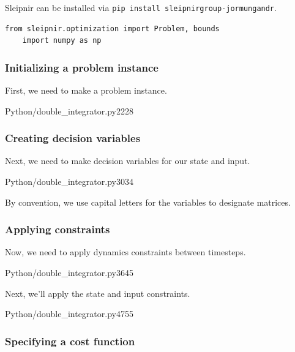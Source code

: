 Sleipnir can be installed via \texttt{pip install sleipnirgroup-jormungandr}.
\begin{code}
  \begin{lstlisting}[style=customPython]
    from sleipnir.optimization import Problem, bounds
    import numpy as np
  \end{lstlisting}
\end{code}

\subsubsection{Initializing a problem instance}

First, we need to make a problem instance.
\begin{coderemotesubset}{Python}{\chapterpath/double_integrator.py}{22}{28}
\end{coderemotesubset}

\subsubsection{Creating decision variables}

Next, we need to make decision variables for our state and input.
\begin{coderemotesubset}{Python}{\chapterpath/double_integrator.py}{30}{34}
\end{coderemotesubset}

By convention, we use capital letters for the variables to designate
matrices.

\subsubsection{Applying constraints}

Now, we need to apply dynamics constraints between timesteps.
\begin{coderemotesubset}{Python}{\chapterpath/double_integrator.py}{36}{45}
\end{coderemotesubset}

Next, we'll apply the state and input constraints.
\begin{coderemotesubset}{Python}{\chapterpath/double_integrator.py}{47}{55}
\end{coderemotesubset}

\subsubsection{Specifying a cost function}

